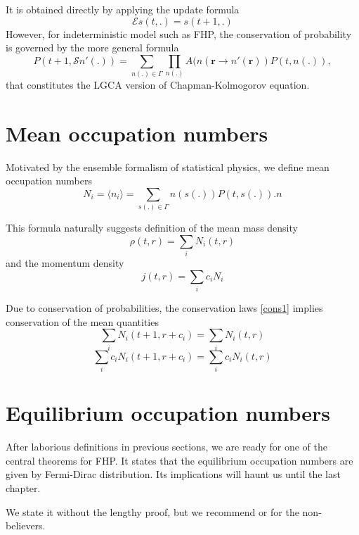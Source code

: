 It is obtained directly by applying the update formula
\begin{equation*}
\mathcal{E} s(t,.) = s(t+1,.)
\end{equation*}
However, for indeterministic model such as FHP, the conservation of probability is governed by the more general formula
\begin{equation}
P(t+1,\mathcal{S} n'(.)) = \sum_{n(.) \in \Gamma} \prod_{n(.)} A(n(\bm{r} \rightarrow n'(\bm{r})) P(t, n(.)),
\end{equation}
that constitutes the LGCA version of Chapman-Kolmogorov equation.

\section{Mean occupation numbers}
Motivated by the ensemble formalism of statistical physics, we define mean occupation numbers
\begin{equation*}
N_i = \langle n_i \rangle = \sum_{s(.) \in \Gamma} n(s(.)) P(t,s(.)) .n
\end{equation*}

This formula naturally suggests definition of the mean mass density
\begin{equation*}
\rho(t,r) = \sum_i N_i(t,r)
\end{equation*}
and the momentum density
\begin{equation*}
j(t,r) = \sum_i c_i N_i
\end{equation*}

Due to conservation of probabilities, the conservation laws \ref{cons1} implies conservation of the mean quantities
\begin{equation} \label{macro1}
\sum_i N_i(t+1,r+c_i) = \sum_i N_i(t,r) 
\end{equation}
\begin{equation} \label{macro2}
\sum_i c_i N_i(t+1,r+c_i) = \sum_i c_i N_i(t,r)
\end{equation}

\section{Equilibrium occupation numbers}
After laborious definitions in previous sections, we are ready for one of the central theorems for FHP. It states that the equilibrium occupation numbers are given by Fermi-Dirac distribution. Its implications will haunt us until the last chapter.

We state it without the lengthy proof, but we recommend \cite{wolf} or \cite{frisch} for the non-believers.

